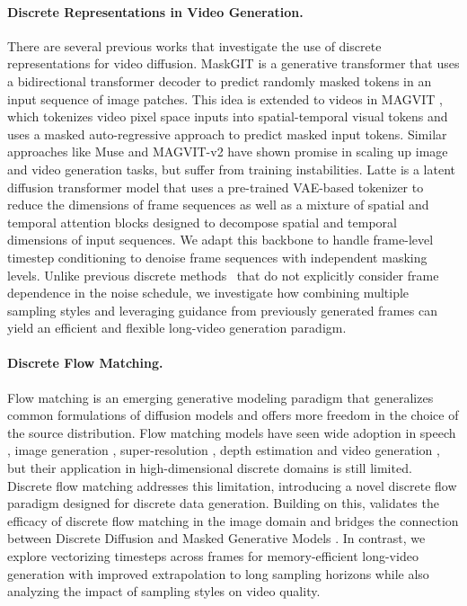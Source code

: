 \paragraph{Discrete Representations in Video Generation.}
There are several previous works that investigate the use of discrete representations for video diffusion. MaskGIT \cite{chang2022maskgit} is a generative transformer that uses a bidirectional transformer decoder to predict randomly masked tokens in an input sequence of image patches. This idea is extended to videos in MAGVIT \cite{yu2023magvit}, which tokenizes video pixel space inputs into spatial-temporal visual tokens and uses a masked auto-regressive approach to predict masked input tokens. Similar approaches like Muse \cite{Chang2023MuseTG} and MAGVIT-v2\cite{yu2023language_magvit2} have shown promise in scaling up image and video generation tasks, but suffer from training instabilities. Latte \cite{ma2024latte} is a latent diffusion transformer model that uses a pre-trained VAE-based tokenizer to reduce the dimensions of frame sequences as well as a mixture of spatial and temporal attention blocks designed to decompose spatial and temporal dimensions of input sequences. We adapt this backbone to handle frame-level timestep conditioning to denoise frame sequences with independent masking levels. Unlike previous discrete methods~\cite{hu2024maskneed,ma2024latte} that do not explicitly consider frame dependence in the noise schedule, we investigate how combining multiple sampling styles and leveraging guidance from previously generated frames can yield an efficient and flexible long-video generation paradigm.

\paragraph{Discrete Flow Matching.}
Flow matching \cite{lipman2022flow} is an emerging generative modeling paradigm that generalizes common formulations of diffusion models and offers more freedom in the choice of the source distribution. Flow matching models have seen wide adoption in speech \cite{liu2023generative}, image generation \cite{hu2024zigma,hulfm,dao2023flow, lipman2022flow}, super-resolution \cite{schusterbauer2024boosting}, depth estimation \cite{gui2024depthfm} and video generation \cite{jin2024pyramidal}, but their application in high-dimensional discrete domains is still limited. Discrete flow matching \cite{gat2024discrete,campbell2024generative,shi2024simplifiedgeneralizedmaskeddiffusion,sahoo2024simpleeffectivemaskeddiffusion} addresses this limitation, introducing a novel discrete flow paradigm designed for discrete data generation. Building on this, \citet{hu2024maskneed} validates the efficacy of discrete flow matching in the image domain and bridges the connection between Discrete Diffusion and Masked Generative Models \cite{chang2022maskgit}. %
In contrast, we explore vectorizing timesteps across frames for memory-efficient long-video generation with improved extrapolation to long sampling horizons while also analyzing the impact of sampling styles on video quality.